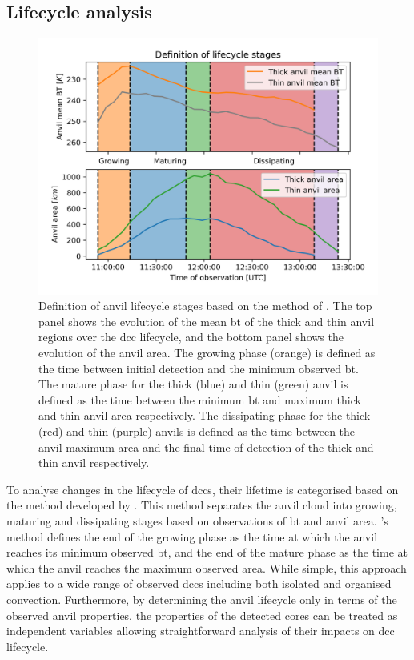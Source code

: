 \subsection{Lifecycle analysis} \label{sec:lifecycle_definition}


\begin{figure}[tp]
    \centering
    \includegraphics[width=\textwidth]{figures/chapter3_02.png}
    \caption[
    Definition of anvil lifecycle stages based on the method of \citet{futyan_deep_2007}
    ]{
    Definition of anvil lifecycle stages based on the method of \citet{futyan_deep_2007}. The top panel shows the evolution of the mean \acrshort{bt} of the thick and thin anvil regions over the \acrshort{dcc} lifecycle, and the bottom panel shows the evolution of the anvil area. The growing phase (orange) is defined as the time between initial detection and the minimum observed \acrshort{bt}. The mature phase for the thick (blue) and thin (green) anvil is defined as the time between the minimum \acrshort{bt} and maximum thick and thin anvil area respectively. The dissipating phase for the thick (red) and thin (purple) anvils is defined as the time between the anvil maximum area and the final time of detection of the thick and thin anvil respectively.
    }
    \label{fig:lifecycle_example}
\end{figure}

To analyse changes in the lifecycle of \acrshort{dcc}s, their lifetime is categorised based on the method developed by \citet{futyan_deep_2007}.
This method separates the anvil cloud into growing, maturing and dissipating stages based on observations of \acrshort{bt} and anvil area.
\citeauthor{futyan_deep_2007}'s method defines the end of the growing phase as the time at which the anvil reaches its minimum observed \acrshort{bt}, and the end of the mature phase as the time at which the anvil reaches the maximum observed area.
While simple, this approach applies to a wide range of observed \acrshort{dcc}s including both isolated and organised convection.
Furthermore, by determining the anvil lifecycle only in terms of the observed anvil properties, the properties of the detected cores can be treated as independent variables allowing straightforward analysis of their impacts on \acrshort{dcc} lifecycle.

